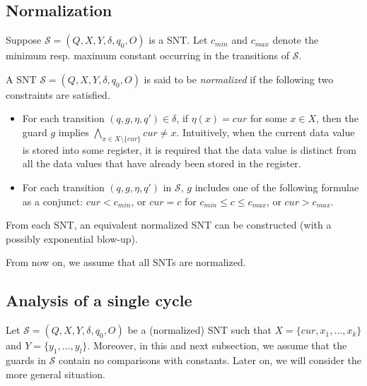 \documentclass[runningheads,a4paper]{llncs}
\def\Ss{{\mathcal{S} }}
\begin{document}


\subsection{Normalization}

Suppose $\Ss=(Q,X,Y,\delta,q_0,O)$ is a SNT. Let $c_{min}$ and $c_{max}$ denote the minimum resp. maximum constant occurring in the transitions of $\Ss$. 


A SNT $\Ss=(Q,X,Y,\delta,q_0,O)$ is said to be \emph{normalized} if the following two constraints are satisfied.
\begin{itemize}
\item For each transition $(q,g,\eta,q') \in \delta$, if $\eta(x)=cur$ for some $x \in X$, then the guard $g$ implies $\bigwedge \limits_{x \in X \setminus \{cur\}} cur \neq x$.  Intuitively, when the current data value is stored into some register, it is required that the data value is distinct from all the data values that have already been stored in the register.
%
\item For each transition $(q, g, \eta, q')$ in $\Ss$, $g$ includes one of the following formulae as a conjunct: $cur < c_{min}$, or $cur = c$ for $c_{min} \le c \le c_{max}$, or $cur > c_{max}$.
\end{itemize}


\begin{proposition}
From each SNT, an equivalent normalized SNT can be constructed (with a possibly exponential blow-up). 
\end{proposition}

From now on, we assume that all SNTs are normalized.


\subsection{Analysis of a single cycle}

Let $\Ss = (Q,X,Y,\delta,q_0,O)$ be a (normalized) SNT such that $X=\{cur, x_1,\dots, x_k\}$ and $Y = \{y_1,\dots,y_l\}$. Moreover, in this and next subsection, we assume that the guards in $\Ss$ contain no comparisons with constants. Later on, we will consider the more general situation.
\end{document}

